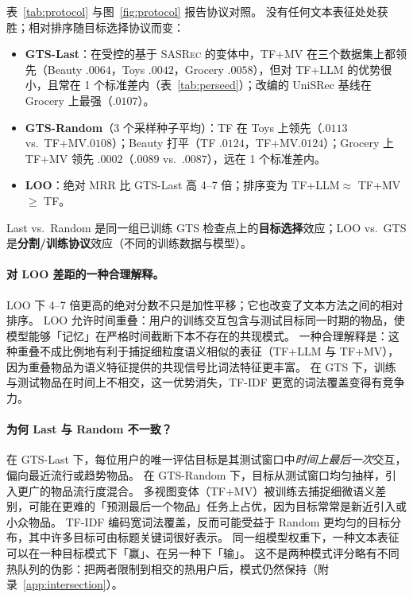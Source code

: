 \documentclass[sigconf,natbib=true,anonymous]{acmart}
\newcommand{\tfidf}{\textsc{TF-IDF}\xspace}
\newcommand{\tfllm}{\textsc{TF+LLM}\xspace}
\newcommand{\tfmv}{\textsc{TF+MV}\xspace}
\newcommand{\base}{\textsc{SASRec}\xspace}
\begin{document}
表~\ref{tab:protocol} 与图~\ref{fig:protocol} 报告协议对照。
没有任何文本表征处处获胜；相对排序随目标选择协议而变：

\begin{itemize}[leftmargin=*,itemsep=1pt]
\item \textbf{GTS-Last}：在受控的基于 \base 的变体中，\tfmv 在三个数据集上都领先（Beauty $.0064$，Toys $.0042$，Grocery $.0058$），但对 \tfllm 的优势很小，且常在 1 个标准差内（表~\ref{tab:perseed}）；改编的 UniSRec 基线在 Grocery 上最强（$.0107$）。
\item \textbf{GTS-Random}（3 个采样种子平均）：TF 在 Toys 上领先（$.0113$ vs.\ \tfmv $.0108$）；Beauty 打平（TF $.0124$，\tfmv $.0124$）；Grocery 上 \tfmv 领先 $.0002$（$.0089$ vs.\ $.0087$），远在 1 个标准差内。
\item \textbf{LOO}：绝对 MRR 比 GTS-Last 高 4--7 倍；排序变为 \tfllm $\approx$ \tfmv $\ge$ TF。
\end{itemize}
Last vs.\ Random 是同一组已训练 GTS 检查点上的\textbf{目标选择}效应；LOO vs.\ GTS 是\textbf{分割/训练协议}效应（不同的训练数据与模型）。

\paragraph{对 LOO 差距的一种合理解释。}
LOO 下 4--7 倍更高的绝对分数不只是加性平移；它也改变了文本方法之间的相对排序。
LOO 允许时间重叠：用户的训练交互包含与测试目标同一时期的物品，使模型能够「记忆」在严格时间截断下本不存在的共现模式。
一种合理解释是：这种重叠不成比例地有利于捕捉细粒度语义相似的表征（\tfllm 与 \tfmv），因为重叠物品为语义特征提供的共现信号比词法特征更丰富。
在 GTS 下，训练与测试物品在时间上不相交，这一优势消失，\tfidf 更宽的词法覆盖变得有竞争力。

\paragraph{为何 Last 与 Random 不一致？}
在 GTS-Last 下，每位用户的唯一评估目标是其测试窗口中\emph{时间上最后一次}交互，偏向最近流行或趋势物品。
在 GTS-Random 下，目标从测试窗口均匀抽样，引入更广的物品流行度混合。
多视图变体（\tfmv）被训练去捕捉细微语义差别，可能在更难的「预测最后一个物品」任务上占优，因为目标常常是新近引入或小众物品。
TF-IDF 编码宽词法覆盖，反而可能受益于 Random 更均匀的目标分布，其中许多目标可由标题关键词很好表示。
同一组模型权重下，一种文本表征可以在一种目标模式下「赢」、在另一种下「输」。
这不是两种模式评分略有不同热队列的伪影：把两者限制到相交的热用户后，模式仍然保持（附录~\ref{app:intersection}）。
\end{document}
